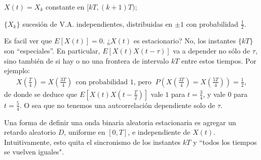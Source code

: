     \begin{minipage}{0.65\textwidth}
    \end{minipage}
    \hfill
    \begin{minipage}{0.3\textwidth}
        $X(t)=X_k$ constante en $[kT,(k+1)T)$;

        $\lbrace X_k\rbrace$ sucesión de V.A. independientes,
        distribuidas en $\pm 1$ con probabilidad $\frac{1}{2}$.
    \end{minipage}

    \noindent Es facil ver que $E\left[X(t)\right]=0$. ¿$X(t)$ es estacionario? No, los instantes $\lbrace kT\rbrace$ son ``especiales''. En
    particular, $E\left[X(t)X(t-\tau)\right]$ va a depender no
    sólo de $\tau$, sino también de si hay o no una frontera de
    intervalo $kT$ entre estos tiempos. Por ejemplo:
    \begin{gather*}
        X\left(\tfrac{T}{4}\right)=X\left(\tfrac{3T}{4}\right)\ \ \text{con probabilidad $1$, pero
        } \
        P\left(X\left(\tfrac{3T}{4}\right)=X\left(\tfrac{5T}{4}\right)\right)=\frac{1}{2},
    \end{gather*}
de donde se deduce que $E\left[X(t)X(t-\frac{T}{2})\right]$ vale
$1$ para $t=\frac{3}{4}$, y vale $0$ para
    $t=\frac{5}{4}$. O sea que no tenemos una autcorrelación
    dependiente solo de $\tau$.

    Una forma de definir una onda binaria aleatoria estacionaria es agregar un retardo aleatorio
    $D$, uniforme en $[0,T]$, e independiente de $X(t)$.
    Intuitivamente, esto quita el sincronismo de los instantes
    $kT$ y ``todos los tiempos se vuelven iguales".

